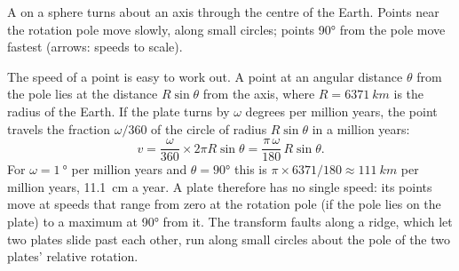 \begin{omfigure}

{\small A  on a sphere turns about an axis through the centre of
the Earth. Points near the rotation pole move slowly, along small circles;
points \ang{90} from the pole move fastest (arrows: speeds to scale).}
\end{omfigure}

The speed of a point is easy to work out. A point at an angular distance
$\theta$ from the pole lies at the distance $R\sin\theta$ from the axis, where
$R = \qty{6371}{km}$ is the radius of the Earth. If the plate turns by $\omega$
degrees per million years, the point travels the fraction $\omega/360$ of the
circle of radius $R\sin\theta$ in a million years:
\[
  v = \frac{\omega}{360} \times 2\pi R\sin\theta
    = \frac{\pi\,\omega}{180}\,R\sin\theta .
\]
For $\omega = \qty{1}{\degree}$ per million years and $\theta = \ang{90}$
this is $\pi \times 6371/180 \approx \qty{111}{km}$ per million years,
\qty{11.1}{cm} a year. A plate therefore has no single speed: its points move
at speeds that range from zero at the rotation pole (if the pole lies on the
plate) to a maximum at \ang{90} from it. The transform faults along a ridge,
which let two plates slide past each other, run along small circles about the
pole of the two plates' relative rotation.

